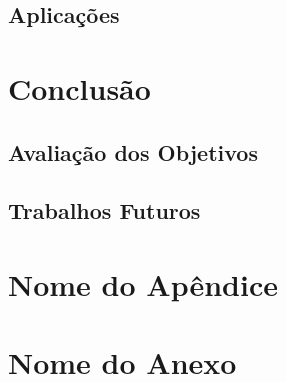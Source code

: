 \documentclass[openright]{normas-utf-tex} %
\begin{document}
		

	\section{Aplicações}\label{application}



\label{chap:anacomp}

\chapter{Conclusão}
\label{chpa:conc}
	
	\section{Avaliação dos Objetivos}

		

	\section{Trabalhos Futuros}

		



\clearpage %
\label{bibstart}
\label{bibend}

\apendice
\chapter{Nome do Ap\^endice}

\anexo
\chapter{Nome do Anexo}
\end{document}

